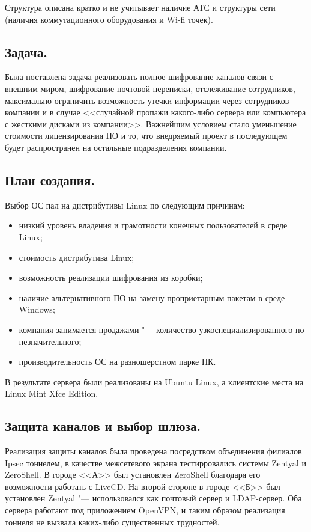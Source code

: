 \documentclass[10pt, a5paper]{article}
\begin{document}
Структура описана кратко и не учитывает наличие АТС и структуры сети (наличия коммутационного оборудования и Wi-fi точек).

\subsection*{Задача.}

Была поставлена задача реализовать полное шифрование каналов связи с внешним миром, шифрование почтовой переписки, отслеживание сотрудников, максимально ограничить возможность утечки информации через сотрудников компании и в случае <<случайной пропажи какого-либо сервера или компьютера с жесткими дисками из компании>>. Важнейшим условием стало уменьшение стоимости лицензирования ПО и то, что внедряемый проект в последующем будет распространен на остальные подразделения компании.

\subsection*{План создания.}

Выбор ОС пал на дистрибутивы Linux по следующим причинам:

\begin{itemize}
  \item низкий уровень владения и грамотности конечных пользователей в среде Linux;
  \item стоимость дистрибутива Linux;
  \item возможность реализации шифрования из коробки;
  \item наличие альтернативного ПО на замену проприетарным пакетам в среде Windows;
  \item компания занимается продажами "--- количество узкоспециализированного по незначительного;
  \item производительность ОС на разношерстном парке ПК.
\end{itemize}

В результате сервера были реализованы на Ubuntu Linux, а клиентские места на Linux Mint Xfce Edition.

\subsection*{Защита каналов и выбор шлюза.}

Реализация защиты каналов была проведена посредством объединения филиалов Ipsec тоннелем, в качестве межсетевого экрана тестирровались системы Zentyal и ZeroShell. В городе <<А>> был установлен ZeroShell благодаря его возможности работать с LiveCD. На второй стороне в городе <<Б>> был установлен Zentyal "--- использовался как почтовый сервер и LDAP-сервер. Оба сервера работают под приложением OpenVPN, и таким образом реализация тоннеля не вызвала каких-либо существенных трудностей.
\end{document}

